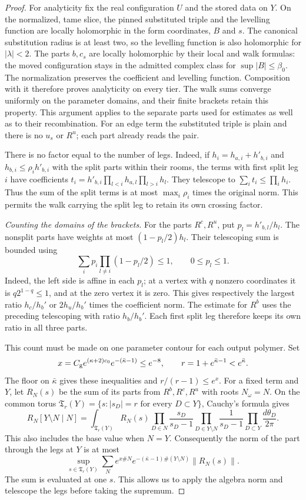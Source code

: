 \documentclass[11pt,letterpaper,reqno]{amsart}
\theoremstyle{definition}
\theoremstyle{remark}
\begin{document}
\begin{proof}
For analyticity fix the real configuration $U$ and the
stored data on $Y$. On the normalized, tame slice, the
pinned substituted triple and the levelling function are
locally holomorphic in the form coordinates, $B$ and $s$.
The canonical substitution radius is at least two, so
the levelling function is also holomorphic for
$|\lambda|<2$. The parts $b,c_s$ are locally holomorphic
by their local and walk formulas: the moved configuration
stays in the admitted complex class for $\sup|B|\le\beta_0$.
The normalization preserves the coefficient and levelling
function. Composition with it therefore proves analyticity
on every tier. The walk sums converge uniformly on the
parameter domains, and their finite brackets retain this
property. This argument applies to the separate parts
used for estimates as well as to their recombination.
For an edge term the substituted triple is plain and
there is no $u_s$ or $R^u$; each part already reads the pair.

There is no factor equal to the number of legs.
Indeed, if $h_i=h_{a,i}+h'_{b,i}$ and
$h_{b,i}\le\rho_i h'_{b,i}$ with the split parts
within their rooms, the terms with first split
leg $i$ have coefficients
$t_i=h'_{b,i}\prod_{l<i}h_{a,l}\prod_{l>i}h_l$.
They telescope to
$\sum_i t_i\le\prod_i h_i$. Thus the sum of the
split terms is at most $\max_i\rho_i$ times the
original norm. This permits the walk carrying the
split leg to retain its own crossing factor.

\emph{Counting the domains of the brackets.}
For the parts $R^c,R^u$, put $p_l=h'_{b,l}/h_l$.
The nonsplit parts have weights at most
$(1-p_l/2)h_l$. Their telescoping sum is bounded
using
\[
 \sum_i p_i\prod_{l\ne i}(1-p_l/2)\le1,
 \qquad 0\le p_l\le1.
\]
Indeed, the left side is affine in each $p_l$;
at a vertex with $q$ nonzero coordinates it is
$q2^{1-q}\le1$, and at the zero vertex it is zero.
This gives respectively the largest ratio
$h_c/h_b'$ or $2h_u/h_b'$ times the coefficient norm.
The estimate for $R^b$ uses the preceding telescoping
with ratio $h_b/h_b'$. Each first split leg therefore
keeps its own ratio in all three parts.

This count must be made on one parameter contour for
each output polymer. Set
\[
 x=C_{\rm g}e^{(\kappa+2)c_0}e^{-(\bar\kappa-1)}
       \le e^{-8},\qquad
 r=1+e^{\bar\kappa-1}<e^{\bar\kappa}.
\]
The floor on $\bar\kappa$ gives these inequalities and
$r/(r-1)\le e^x$. For a fixed term and $Y$, let $R_N(s)$
be the sum of its parts from $R^b,R^c,R^u$ with roots
$N_\omega=N$. On the common torus
$\mathfrak T_r(Y)=\{s:|s_D|=r\text{ for every }D\subset Y\}$,
Cauchy's formula gives
\[
 R_N[Y\setminus N\mid N]
 =\int_{\mathfrak T_r(Y)}R_N(s)
     \prod_{D\in N}\frac{s_D}{s_D-1}
     \prod_{D\in Y\setminus N}\frac1{s_D-1}
     \prod_{D\subset Y}\frac{d\theta_D}{2\pi}.
\]
This also includes the base value when $N=Y$.
Consequently the norm of the part through the legs at $Y$
is at most
\[
 \sup_{s\in\mathfrak T_r(Y)}
 \sum_N e^{x\#N}e^{-(\bar\kappa-1)\#(Y\setminus N)}
                                      \|R_N(s)\|.
\]
The sum is evaluated at one $s$. This allows us to apply
the algebra norm and telescope the legs before taking
the supremum.


\end{proof}
\end{document}
